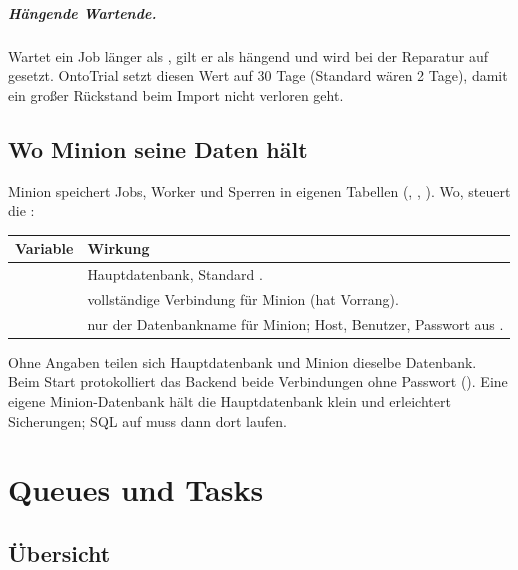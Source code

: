 \documentclass[11pt,a4paper,parskip=half-,headings=standardclasses,toc=bibliography,open=any]{scrreprt}
\begin{document}
\paragraph{Hängende Wartende.} Wartet ein Job länger als , gilt er als hängend und wird bei der Reparatur auf  gesetzt. OntoTrial setzt diesen Wert auf 30 Tage (Standard wären 2 Tage), damit ein großer Rückstand beim Import nicht verloren geht.

\section{Wo Minion seine Daten hält}

Minion speichert Jobs, Worker und Sperren in eigenen Tabellen (, , ). Wo, steuert die :

\begin{tabularx}{\textwidth}{@{}P{4.4cm}L@{}}
\toprule
\textbf{Variable} & \textbf{Wirkung}\\
\midrule
{} & Hauptdatenbank, Standard .\\
 & vollständige Verbindung für Minion (hat Vorrang).\\
 & nur der Datenbankname für Minion; Host, Benutzer, Passwort aus .\\
\bottomrule
\end{tabularx}

Ohne Angaben teilen sich Hauptdatenbank und Minion dieselbe Datenbank. Beim Start protokolliert das Backend beide Verbindungen ohne Passwort (). Eine eigene Minion-Datenbank hält die Hauptdatenbank klein und erleichtert Sicherungen; SQL auf  muss dann dort laufen.

\chapter{Queues und Tasks}\label{kap:queues}

\section{Übersicht}
\end{document}
